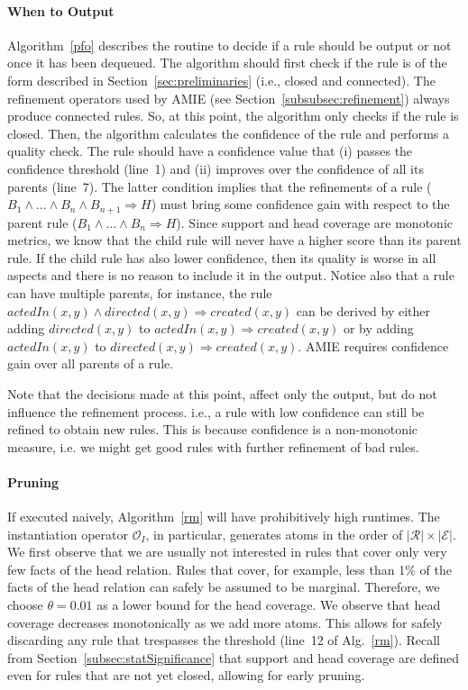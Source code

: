 \paragraph{When to Output}\label{subsubsec:whenToOutput}
Algorithm~\ref{pfo} describes the routine to decide if a rule should be output or not once it has been dequeued.
The algorithm should first check if the rule is of the form described in Section~\ref{sec:preliminaries} (i.e., closed and connected).
The refinement operators used by AMIE (see Section~\ref{subsubsec:refinement}) always produce connected rules. 
So, at this point, the algorithm only checks if the rule is closed. Then, the algorithm calculates
the confidence of the rule and performs a quality check. The rule should have a confidence value that (i) passes the confidence threshold (line~1)
and (ii) improves over the confidence of all its parents (line~7).
The latter condition implies that the refinements of a rule ($B_1 \wedge ... \wedge B_n \wedge B_{n+1} \Rightarrow H$) must 
bring some confidence gain with respect to the parent rule
($B_1 \wedge ... \wedge B_n \Rightarrow H$). Since support and head coverage are monotonic metrics, 
we know that the child rule will never have a higher score than its parent rule. 
If the child rule has also lower confidence, then its quality is worse in all aspects and there is no reason to include it in the output.
Notice also that a rule can have multiple parents, for instance, the rule $actedIn(x,y) \wedge directed(x,y) \Rightarrow created(x,y)$
can be derived by either adding $directed(x,y)$ to  $actedIn(x,y) \Rightarrow created(x,y)$ or by adding $actedIn(x,y)$ to
$directed(x,y) \Rightarrow created(x,y)$. AMIE requires confidence gain over all parents of a rule.

Note that the decisions made at this point, affect only the output, but do not influence the refinement process. i.e., a rule with low confidence can still be refined to obtain new rules.
This is because confidence is a non-monotonic measure, i.e. we might get good rules with further refinement of bad rules.




\paragraph{Pruning}
If executed naively, Algorithm~\ref{rm} will have prohibitively high runtimes.
The instantiation operator $\mathcal{O}_I$, in particular, generates atoms in the order of $|\mathcal{R}| \times |\mathcal{E}|$.
We first observe that we are usually not interested in rules that cover only very few facts of the head relation.
Rules that cover, for example, less than 1\% of the facts of the head relation can safely be assumed to be marginal.
Therefore, we choose $\theta=0.01$ as a lower bound for the head coverage. We observe that head coverage decreases monotonically as we add more atoms.
This allows for safely discarding any rule that trespasses the threshold (line~12 of Alg.~\ref{rm}).
Recall from Section~\ref{subsec:statSignificance} that support and head coverage are defined even for rules that are not yet closed, allowing for early pruning.

